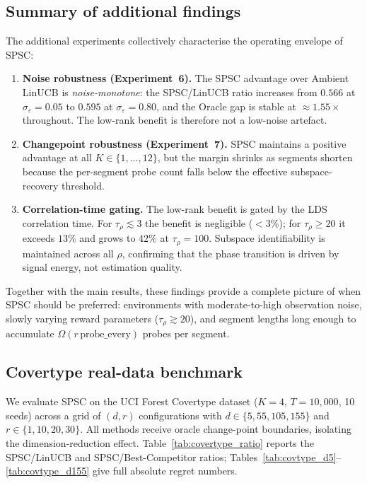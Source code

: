 \documentclass{article}
\begin{document}
{\subsection{Summary of additional findings}
\label{app:findings_summary}

The additional experiments collectively characterise the operating envelope of SPSC:
\begin{enumerate}
  \item \textbf{Noise robustness (Experiment~6).}
  The SPSC advantage over Ambient LinUCB is \emph{noise-monotone}: the SPSC/LinUCB ratio increases from $0.566$ at $\sigma_\varepsilon{=}0.05$ to $0.595$ at $\sigma_\varepsilon{=}0.80$, and the Oracle gap is stable at $\approx 1.55\times$ throughout. The low-rank benefit is therefore not a low-noise artefact.

  \item \textbf{Changepoint robustness (Experiment~7).}
  SPSC maintains a positive advantage at all $K \in \{1,\ldots,12\}$, but the margin shrinks as segments shorten because the per-segment probe count falls below the effective subspace-recovery threshold.

  \item \textbf{Correlation-time gating.}
  The low-rank benefit is gated by the LDS correlation time. For $\tau_\rho \lesssim 3$ the benefit is negligible ($< 3\%$); for $\tau_\rho \geq 20$ it exceeds $13\%$ and grows to $42\%$ at $\tau_\rho{=}100$. Subspace identifiability is maintained across all $\rho$, confirming that the phase transition is driven by signal energy, not estimation quality.
\end{enumerate}

\noindent Together with the main results, these findings provide a complete picture of when SPSC should be preferred: environments with moderate-to-high observation noise, slowly varying reward parameters ($\tau_\rho \gtrsim 20$), and segment lengths long enough to accumulate $\Omega(r\,\mathrm{probe\_every})$ probes per segment.

 \subsection{Covertype real-data benchmark}
  \label{app:covertype_real}

  We evaluate SPSC on the UCI Forest Covertype dataset ($K{=}4$, $T{=}10{,}000$, 10 seeds) across a grid of $(d,r)$
  configurations with $d \in \{5, 55, 105, 155\}$ and $r \in \{1, 10, 20, 30\}$.
  All methods receive oracle change-point boundaries, isolating the dimension-reduction effect.
  Table~\ref{tab:covertype_ratio} reports the SPSC/LinUCB and SPSC/Best-Competitor ratios;
  Tables~\ref{tab:covtype_d5}--\ref{tab:covtype_d155} give full absolute regret numbers.

}
\end{document}
